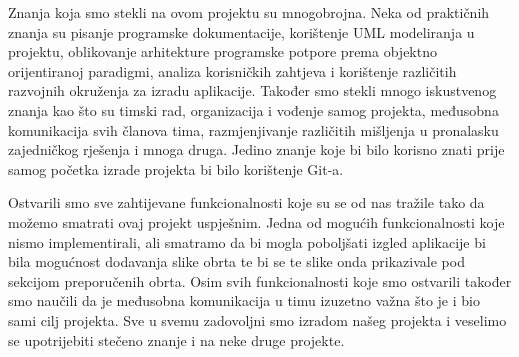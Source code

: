         Znanja koja smo stekli na ovom projektu su mnogobrojna. Neka od praktičnih znanja su pisanje programske dokumentacije, korištenje UML modeliranja u projektu, oblikovanje arhitekture programske potpore prema objektno orijentiranoj paradigmi, analiza korisničkih zahtjeva i korištenje različitih razvojnih okruženja za izradu aplikacije. Također smo stekli mnogo iskustvenog znanja kao što su timski rad, organizacija i vođenje samog projekta, međusobna komunikacija svih članova tima, razmjenjivanje različitih mišljenja u pronalasku zajedničkog rješenja i mnoga druga. Jedino znanje koje bi bilo korisno znati prije samog početka izrade projekta bi bilo korištenje Git-a.
        
        Ostvarili smo sve zahtijevane funkcionalnosti koje su se od nas tražile tako da možemo smatrati ovaj projekt uspješnim. Jedna od mogućih funkcionalnosti koje nismo implementirali, ali smatramo da bi mogla poboljšati izgled aplikacije bi bila mogućnost dodavanja slike obrta te bi se te slike onda prikazivale pod sekcijom preporučenih obrta. Osim svih funkcionalnosti koje smo ostvarili također smo naučili da je međusobna komunikacija u timu izuzetno važna što je i bio sami cilj projekta. Sve u svemu zadovoljni smo izradom našeg projekta i veselimo se upotrijebiti stečeno znanje i na neke druge projekte.


		\eject 